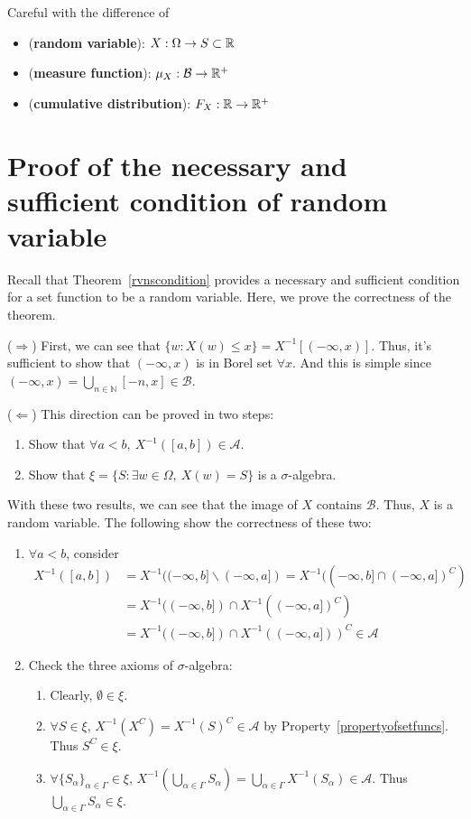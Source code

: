 \documentclass[Probability_Theory.tex]{subfiles}
\begin{document}
\begin{intuition}
	Careful with the difference of 
	\begin{itemize}
		\item ({\bf random variable}): $X:\Omega\rightarrow S\subset{\mathbb R}$
		\item ({\bf measure function}): $\mu_X:\mathcal{B}\rightarrow{\mathbb R}^+$
		\item ({\bf cumulative distribution}): $F_X:{\mathbb R}\rightarrow{\mathbb R}^+$
	\end{itemize}
\end{intuition}


\appendix
\section{Proof of the necessary and sufficient condition of random variable}\label{sec:proofrvnscondition}
Recall that Theorem~\ref{rvnscondition} provides a necessary and sufficient condition for a set function to be a random variable. Here, we prove the correctness of the theorem.

($\Rightarrow$) First, we can see that $\{w:X(w)\leq x\} = X^{-1}[(-\infty,x)]$. Thus, it's sufficient to show that $(-\infty,x)$ is in Borel set $\forall x$. And this is simple since $(-\infty,x) = \bigcup_{n\in\mathbb{N}}[-n,x]\in\mathcal{B}$.

($\Leftarrow$) This direction can be proved in two steps:
\begin{enumerate}
	\item Show that $\forall a<b,\ X^{-1}([a,b])\in\mathcal{A}$.
	\item Show that $\xi = \{S:\exists w\in\Omega,\ X(w)=S \}$ is a $\sigma$-algebra.
\end{enumerate}
With these two results, we can see that the image of $X$ contains $\mathcal{B}$. Thus, $X$ is a random variable. The following show the correctness of these two:
\begin{enumerate}
	\item $\forall a<b$, consider
	\begin{align*}
	X^{-1}([a,b]) &= X^{-1}((-\infty,b]\backslash(-\infty,a]) = X^{-1}((-\infty,b]\cap(-\infty,a])^C)\\
	&= X^{-1}((-\infty,b]) \cap X^{-1}((-\infty,a])^C)\\
	&=  X^{-1}((-\infty,b]) \cap X^{-1}((-\infty,a]))^C\in\mathcal{A}
	\end{align*}
	\item Check the three axioms of $\sigma$-algebra:
	\begin{enumerate}
		\item Clearly, $\emptyset\in\xi$.
		\item $\forall S\in\xi$, $X^{-1}(X^C) = X^{-1}(S)^C\in\mathcal{A}$ by Property~\ref{propertyofsetfuncs}. Thus $S^C\in\xi$.
		\item $\forall \{S_{\alpha}\}_{\alpha\in\Gamma}\in\xi$, $X^{-1}(\bigcup_{\alpha\in\Gamma}S_{\alpha}) = \bigcup_{\alpha\in\Gamma}X^{-1}(S_{\alpha})\in\mathcal{A}$. Thus $\bigcup_{\alpha\in\Gamma}S_{\alpha}\in\xi$.
	\end{enumerate}
\end{enumerate}
\end{document}
